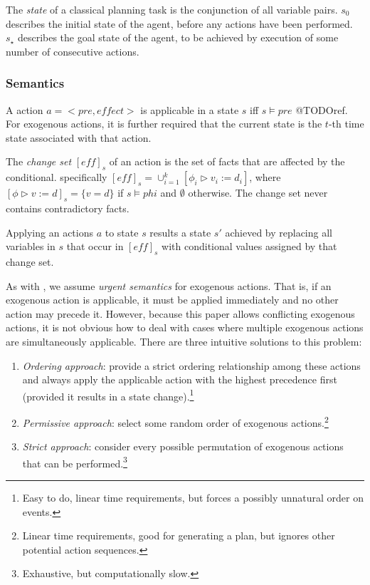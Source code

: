 \documentclass{article}
\theoremstyle{plain}
\theoremstyle{definition}
\begin{document}
The \textit{state} of a classical planning task is the conjunction of all variable pairs. $s_0$ describes the initial state of the agent, before any actions have been performed. $s_\star$ describes the goal state of the agent, to be achieved by execution of some number of consecutive actions.

\subsubsection*{Semantics}
A action $a=<pre, effect>$ is applicable in a state $s$ iff $s\models pre$ @TODOref. For exogenous actions, it is further required that the current state is the $t$-th time state associated with that action. 

The \textit{change set} $[eff]_s$ of an action is the set of facts that are affected by the conditional. specifically $[eff]_s=\cup^k_{i=1}[\phi_i \triangleright v_i:=d_i]$, where $[\phi \triangleright v:=d]_s=\{v=d\}$ if $s \models phi$ and $\emptyset$ otherwise. The change set never contains contradictory facts.

Applying an actions $a$ to state $s$ results a state $s'$ achieved by replacing all variables in $s$ that occur in $[eff]_s$ with conditional values assigned by that change set.

As with \cite{lind2019ethical}, we assume \textit{urgent semantics} for exogenous actions. That is, if an exogenous action is applicable, it must be applied immediately and no other action may precede it. However, because this paper allows conflicting exogenous actions, it is not obvious how to deal with cases where multiple exogenous actions are simultaneously applicable. There are three intuitive solutions to this problem:
\begin{enumerate}
\item \textit{Ordering approach}: provide a strict ordering relationship among these actions and always apply the applicable action with the highest precedence first (provided it results in a state change).\footnote{Easy to do, linear time requirements, but forces a possibly unnatural order on events.}
\item \textit{Permissive approach}: select some random order of exogenous actions.\footnote{Linear time requirements, good for generating a plan, but ignores other potential action sequences.}
\item \textit{Strict approach}: consider every possible permutation of exogenous actions that can be performed.\footnote{Exhaustive, but computationally slow.}
\end{enumerate}
\end{document}
